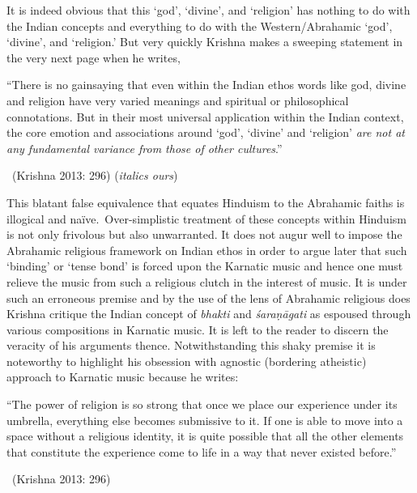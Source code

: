 \newpage

It is indeed obvious that this ‘god’, ‘divine’, and ‘religion’ has nothing to do with the Indian concepts and everything to do with the Western/Abrahamic ‘god’, ‘divine’, and ‘religion.’ But very quickly Krishna makes a sweeping statement in the very next page when he writes,

\begin{myquote}
“There is no gainsaying that even within the Indian ethos words like god, divine and religion have very varied meanings and spiritual or philosophical connotations. But in their most universal application within the Indian context, the core emotion and associations around ‘god’, ‘divine’ and ‘religion’ \textit{are not at any fundamental variance from those of other cultures}.” 

\vspace{-.2cm}

~\hfill (Krishna 2013: 296) (\textit{italics ours})
\end{myquote}

This blatant false equivalence that equates Hinduism to the Abrahamic faiths is illogical and naïve.~Over-simplistic treatment of these concepts within Hinduism is not only frivolous but also unwarranted. It does not augur well to impose the Abrahamic religious framework on Indian ethos in order to argue later that such ‘binding’ or ‘tense bond’ is forced upon the Karnatic music and hence one must relieve the music from such a religious clutch in the interest of music. It is under such an erroneous premise and by the use of the lens of Abrahamic religious does Krishna critique the Indian concept of \textit{bhakti} and \textit{śaraṇāgati }as espoused through various compositions in Karnatic music. It is left to the reader to discern the veracity of his arguments thence. Notwithstanding this shaky premise it is noteworthy to highlight his obsession with agnostic (bordering atheistic) approach to Karnatic music because he writes:

\begin{myquote}
“The power of religion is so strong that once we place our experience under its umbrella, everything else becomes submissive to it. If one is able to move into a space without a religious identity, it is quite possible that all the other elements that constitute the experience come to life in a way that never existed before.” 

\vspace{-.2cm}

~\hfill (Krishna 2013: 296)
\end{myquote}

